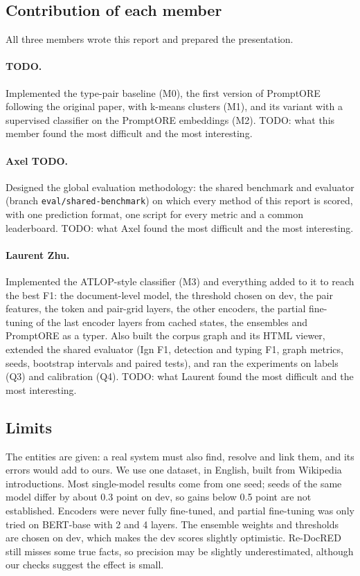 \documentclass[pdflatex,sn-mathphys-num]{sn-jnl}
\begin{document}
\subsection{Contribution of each member}

All three members wrote this report and prepared the presentation.

\paragraph{TODO.} %
Implemented the type-pair baseline (M0), the first version of PromptORE following the original paper, with k-means clusters (M1), and its variant with a supervised classifier on the PromptORE embeddings (M2).
TODO: what this member found the most difficult and the most interesting.

\paragraph{Axel TODO.} %
Designed the global evaluation methodology: the shared benchmark and evaluator (branch \texttt{eval/shared-benchmark}) on which every method of this report is scored, with one prediction format, one script for every metric and a common leaderboard.
TODO: what Axel found the most difficult and the most interesting.

\paragraph{Laurent Zhu.} Implemented the ATLOP-style classifier (M3) and everything added to it to reach the best F1: the document-level model, the threshold chosen on dev, the pair features, the token and pair-grid layers, the other encoders, the partial fine-tuning of the last encoder layers from cached states, the ensembles and PromptORE as a typer. Also built the corpus graph and its HTML viewer, extended the shared evaluator (Ign F1, detection and typing F1, graph metrics, seeds, bootstrap intervals and paired tests), and ran the experiments on labels (Q3) and calibration (Q4).
TODO: what Laurent found the most difficult and the most interesting.

\subsection{Limits}

The entities are given: a real system must also find, resolve and link them, and its errors would add to ours. We use one dataset, in English, built from Wikipedia introductions. Most single-model results come from one seed; seeds of the same model differ by about 0.3 point on dev, so gains below 0.5 point are not established. Encoders were never fully fine-tuned, and partial fine-tuning was only tried on BERT-base with 2 and 4 layers. The ensemble weights and thresholds are chosen on dev, which makes the dev scores slightly optimistic. Re-DocRED still misses some true facts, so precision may be slightly underestimated, although our checks suggest the effect is small.
\end{document}
